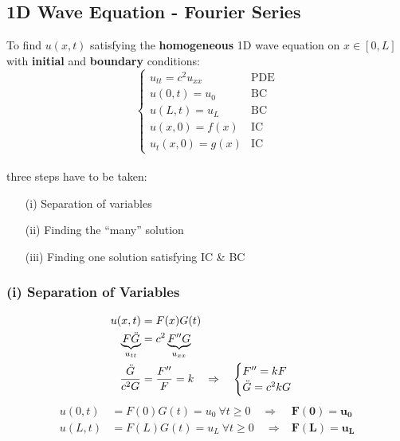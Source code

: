 \subsection{1D Wave Equation - Fourier Series}\label{ssec:1d_wave_FS}
To find $u(x,t)$ satisfying the \textbf{homogeneous} 1D wave equation on $x\in[0,L]$ with \textbf{initial} and
\textbf{boundary} conditions:
\begin{equation*}
    \begin{cases}
        u_{tt}=c^2u_{xx} & \text{PDE} \\
        u(0,t)=u_0       & \text{BC}  \\
        u(L,t)=u_L       & \text{BC}  \\
        u(x,0)=f(x)      & \text{IC}  \\
        u_t(x,0)=g(x)    & \text{IC}
    \end{cases}
\end{equation*}\\
three steps have to be taken:
\begin{itemize}
    \item[(i)] Separation of variables
    \item[(ii)] Finding the ``many'' solution
    \item[(iii)] Finding one solution satisfying IC \& BC
\end{itemize}

\subsubsection{(i) Separation of Variables}
\begin{align*}
    u(x,t)                          & =F(x)G(t)                                               \\
    \underbrace{F\ddot{G}}_{u_{tt}} & =c^2\underbrace{F''G}_{u_{xx}}                          \\
    \frac{\ddot{G}}{c^2G}           & =\frac{F''}{F}=k\hspace*{10pt}\Rightarrow\hspace*{10pt}
    \begin{cases}
        F''=kF \\
        \ddot{G}=c^2kG
    \end{cases}
\end{align*}
\begin{align*}
    u(0,t) & =F(0)G(t)=u_0\mathrm{~}\forall t\geq0\quad\Rightarrow & \mathbf{F(0)}=\mathbf{u_0} \\
    u(L,t) & =F(L)G(t)=u_L\mathrm{~}\forall t\geq0\quad\Rightarrow & \mathbf{F(L)}=\mathbf{u_L}
\end{align*}

